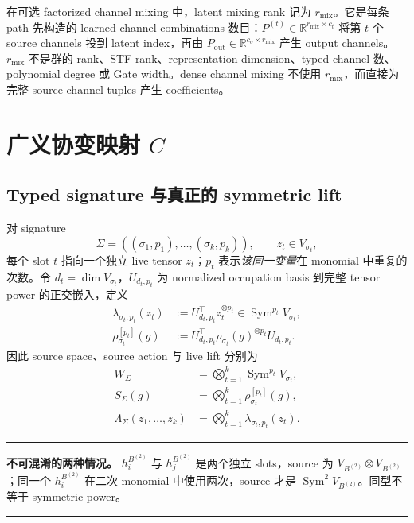\documentclass[11pt,a4paper,fontset=fandol]{ctexart}
\newcommand{\R}{\mathbb R}
\newcommand{\Sym}{\operatorname{Sym}}
\newenvironment{designbox}
{\par\smallskip\noindent\begin{center}\begin{minipage}{0.94\linewidth}
 \color{Ink}\hrule\vspace{.55em}\color{black}}
{\vspace{.45em}\color{Ink}\hrule\end{minipage}\end{center}\smallskip}
\begin{document}
在可选 factorized channel mixing 中，latent mixing rank 记为 $r_{\mathrm{mix}}$。它是每条 path 先构造的 learned channel combinations 数目：$P^{(t)}\in\R^{r_{\mathrm{mix}}\times c_t}$ 将第 $t$ 个 source channels 投到 latent index，再由 $P_{\mathrm{out}}\in\R^{c_o\times r_{\mathrm{mix}}}$ 产生 output channels。$r_{\mathrm{mix}}$ 不是群的 rank、STF rank、representation dimension、typed channel 数、polynomial degree 或 Gate width。dense channel mixing 不使用 $r_{\mathrm{mix}}$，而直接为完整 source-channel tuples 产生 coefficients。

\section{广义协变映射 $C$}
\label{sec:c-math}

\subsection{Typed signature 与真正的 symmetric lift}

对 signature
\begin{equation}
  \Sigma=((\sigma_1,p_1),\ldots,(\sigma_k,p_k)),
  \qquad z_t\in V_{\sigma_t},
\end{equation}
每个 slot $t$ 指向一个独立 live tensor $z_t$；$p_t$ 表示\emph{该同一变量}在 monomial 中重复的次数。令 $d_t=\dim V_{\sigma_t}$，$U_{d_t,p_t}$ 为 normalized occupation basis 到完整 tensor power 的正交嵌入，定义
\begin{align}
  \lambda_{\sigma_t,p_t}(z_t)
  &:=U_{d_t,p_t}^\top z_t^{\otimes p_t}
  \in \Sym^{p_t}V_{\sigma_t},\\
  \rho_{\sigma_t}^{[p_t]}(g)
  &:=U_{d_t,p_t}^\top\rho_{\sigma_t}(g)^{\otimes p_t}U_{d_t,p_t}.
\end{align}
因此 source space、source action 与 live lift 分别为
\begin{align}
  W_\Sigma
  &=\bigotimes_{t=1}^{k}\Sym^{p_t}V_{\sigma_t},\\
  S_\Sigma(g)
  &=\bigotimes_{t=1}^{k}\rho_{\sigma_t}^{[p_t]}(g),\\
  \Lambda_\Sigma(z_1,\ldots,z_k)
  &=\bigotimes_{t=1}^{k}\lambda_{\sigma_t,p_t}(z_t).
  \label{eq:source-lift}
\end{align}

\begin{designbox}
\textbf{不可混淆的两种情况。}
$h_i^{B^{(2)}}$ 与 $h_j^{B^{(2)}}$ 是两个独立 slots，source 为
$V_{B^{(2)}}\otimes V_{B^{(2)}}$；同一个 $h_i^{B^{(2)}}$ 在二次 monomial 中使用两次，source 才是
$\Sym^2V_{B^{(2)}}$。同型不等于 symmetric power。
\end{designbox}
\end{document}
